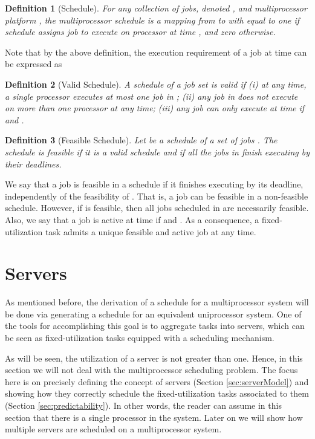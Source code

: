 \documentclass[twocolumn, compsocconf]{IEEEtran}
\newtheorem{definition}{Definition}[section]
\newcounter{proc}
\begin{document}
\begin{definition}[Schedule]
  For any collection of jobs, denoted , and multiprocessor platform
  , the multiprocessor schedule  is a mapping from  to  with  equal
  to one if schedule  assigns job  to execute on processor  at
  time , and zero otherwise.
\end{definition}

Note that by the above definition, the execution requirement of a job  at
time  can be expressed as


\begin{definition}[Valid Schedule]
  A schedule  of a job set  is valid if (i) at any time, a
  single processor executes at most one job in ; (ii) any job in
   does not execute on more than one processor at any time; (iii) any
  job  can only execute at time  if  and .
\end{definition}

\begin{definition}[Feasible Schedule]
  Let  be a schedule of a set of jobs . The schedule
   is feasible if it is a valid schedule and if all the jobs in
   finish executing by their deadlines.
\end{definition}

We say that a job is feasible in a schedule  if it finishes executing by
its deadline, independently of the feasibility of . That is, a job can
be feasible in a non-feasible schedule. However, if  is feasible, then
all jobs scheduled in  are necessarily feasible. Also, we say that a job
 is active at time  if  and .  As a
consequence, a fixed-utilization task admits a unique feasible and active job at
any time.



\section{Servers}\label{sec:server}

As mentioned before, the derivation of a schedule for a multiprocessor system will
be done via generating a schedule for an equivalent uniprocessor system. One of
the tools for accomplishing this goal is to aggregate tasks into servers, which
can be seen as fixed-utilization tasks equipped with a scheduling mechanism.

As will be seen, the utilization of a server is not greater than one. Hence, in
this section we will not deal with the multiprocessor scheduling problem. The
focus here is on precisely defining the concept of servers (Section
\ref{sec:serverModel}) and showing how they correctly schedule the
fixed-utilization tasks associated to them (Section
\ref{sec:predictability}). In other words, the reader can assume in this section
that there is a single processor in the system. Later on we will show how
multiple servers are scheduled on a multiprocessor system.
\end{document}
